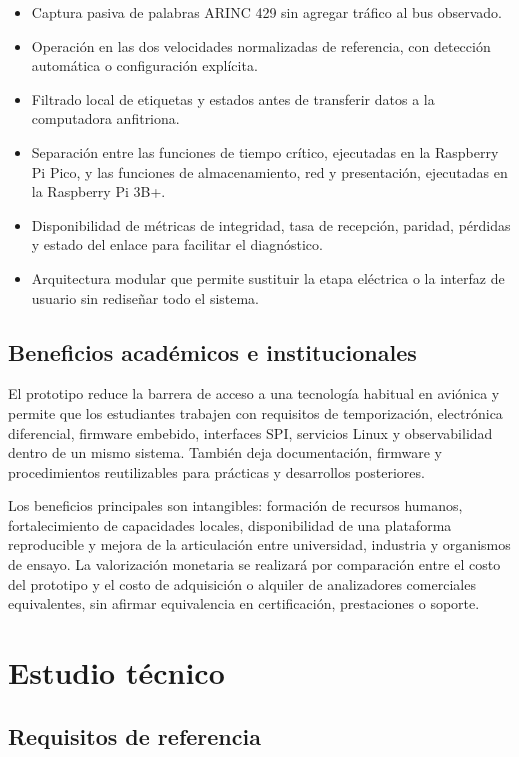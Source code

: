 \documentclass[12pt,a4paper,oneside]{article}
\begin{document}
\begin{itemize}
  \item Captura pasiva de palabras ARINC 429 sin agregar tráfico al bus observado.
  \item Operación en las dos velocidades normalizadas de referencia, con detección automática o configuración explícita.
  \item Filtrado local de etiquetas y estados antes de transferir datos a la computadora anfitriona.
  \item Separación entre las funciones de tiempo crítico, ejecutadas en la Raspberry Pi Pico, y las funciones de almacenamiento, red y presentación, ejecutadas en la Raspberry Pi 3B+.
  \item Disponibilidad de métricas de integridad, tasa de recepción, paridad, pérdidas y estado del enlace para facilitar el diagnóstico.
  \item Arquitectura modular que permite sustituir la etapa eléctrica o la interfaz de usuario sin rediseñar todo el sistema.
\end{itemize}

\subsection{Beneficios académicos e institucionales}

El prototipo reduce la barrera de acceso a una tecnología habitual en aviónica y permite que los estudiantes trabajen con requisitos de temporización, electrónica diferencial, firmware embebido, interfaces SPI, servicios Linux y observabilidad dentro de un mismo sistema. También deja documentación, firmware y procedimientos reutilizables para prácticas y desarrollos posteriores.

Los beneficios principales son intangibles: formación de recursos humanos, fortalecimiento de capacidades locales, disponibilidad de una plataforma reproducible y mejora de la articulación entre universidad, industria y organismos de ensayo. La valorización monetaria se realizará por comparación entre el costo del prototipo y el costo de adquisición o alquiler de analizadores comerciales equivalentes, sin afirmar equivalencia en certificación, prestaciones o soporte.

\section{Estudio técnico}

\subsection{Requisitos de referencia}
\end{document}
